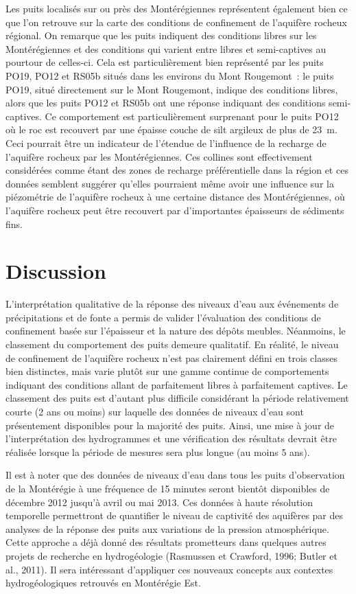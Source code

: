 \documentclass[WHATMANUAL.tex]{subfiles}
\begin{document}
Les puits localisés sur ou près des Montérégiennes représentent également bien ce que l'on retrouve sur la carte des conditions de confinement de l’aquifère rocheux régional. On remarque que les puits indiquent des conditions libres sur les Montérégiennes et des conditions qui varient entre libres et semi-captives au pourtour de celles-ci. Cela est particulièrement bien représenté par les puits PO19, PO12 et RS05b situés dans les environs du Mont Rougemont : le puits PO19, situé directement sur le Mont Rougemont, indique des conditions libres, alors que les puits PO12 et RS05b ont une réponse indiquant des conditions semi-captives. Ce comportement est particulièrement surprenant pour le puits PO12 où le roc est recouvert par une épaisse couche de silt argileux de plus de 23 m. Ceci pourrait être un indicateur de l'étendue de l'influence de la recharge de l’aquifère rocheux par les Montérégiennes. Ces collines sont effectivement considérées comme étant des zones de recharge préférentielle dans la région et ces données semblent suggérer qu’elles pourraient même avoir une influence sur la piézométrie de l’aquifère rocheux à une certaine distance des Montérégiennes, où l’aquifère rocheux peut être recouvert par d'importantes épaisseurs de sédiments fins.

\section{Discussion}

L'interprétation qualitative de la réponse des niveaux d'eau aux événements de précipitations et de fonte a permis de valider l’évaluation des conditions de confinement basée sur l’épaisseur et la nature des dépôts meubles. Néanmoins, le classement du comportement des puits demeure qualitatif. En réalité, le niveau de confinement de l’aquifère rocheux n'est pas clairement défini en trois classes bien distinctes, mais varie plutôt sur une gamme continue de comportements indiquant des conditions allant de parfaitement libres à parfaitement captives. Le classement des puits est d'autant plus difficile considérant la période relativement courte (2 ans ou moins) sur laquelle des données de niveaux d’eau sont présentement disponibles pour la majorité des puits. Ainsi, une mise à jour de l’interprétation des hydrogrammes et une vérification des résultats devrait être réalisée lorsque la période de mesures sera plus longue (au moins 5 ans).  

Il est à noter que des données de niveaux d'eau dans tous les puits d'observation de la Montérégie à une fréquence de 15 minutes seront bientôt disponibles de décembre 2012 jusqu'à avril ou mai 2013. Ces données à haute résolution temporelle permettront de quantifier le niveau de captivité des aquifères par des analyses de la réponse des puits aux variations de la pression atmosphérique. Cette approche a déjà donné des résultats prometteurs dans quelques autres projets de recherche en hydrogéologie (Rasmussen et Crawford, 1996; Butler et al., 2011). Il sera intéressant d'appliquer ces nouveaux concepts aux contextes hydrogéologiques retrouvés en Montérégie Est.
\end{document}
